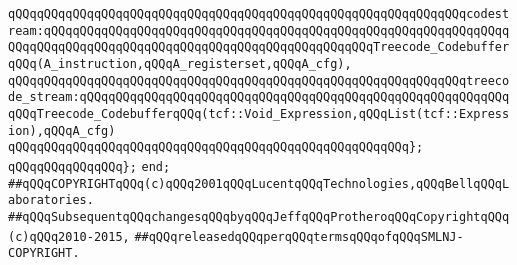 \newline
\verb|qQQqqQQqqQQqqQQqqQQqqQQqqQQqqQQqqQQqqQQqqQQqqQQqqQQqqQQqqQQqqQQqcodestream:qQQqqQQqqQQqqQQqqQQqqQQqqQQqqQQqqQQqqQQqqQQqqQQqqQQqqQQqqQQqqQQqqQQqqQQqqQQqqQQqqQQqqQQqqQQqqQQqqQQqqQQqqQQqqQQqqQQqTreecode_CodebufferqQQq(A_instruction,qQQqA_registerset,qQQqA_cfg),|\newline
\verb|qQQqqQQqqQQqqQQqqQQqqQQqqQQqqQQqqQQqqQQqqQQqqQQqqQQqqQQqqQQqqQQqtreecode_stream:qQQqqQQqqQQqqQQqqQQqqQQqqQQqqQQqqQQqqQQqqQQqqQQqqQQqqQQqqQQqqQQqTreecode_CodebufferqQQq(tcf::Void_Expression,qQQqList(tcf::Expression),qQQqA_cfg)|\newline
\verb|qQQqqQQqqQQqqQQqqQQqqQQqqQQqqQQqqQQqqQQqqQQqqQQqqQQqqQQq};|\newline
\verb|qQQqqQQqqQQqqQQq};|\newline
\verb|end;|\newline
\newline
\newline
\newline
\newline
\newline
\verb|##qQQqCOPYRIGHTqQQq(c)qQQq2001qQQqLucentqQQqTechnologies,qQQqBellqQQqLaboratories.|\newline
\verb|##qQQqSubsequentqQQqchangesqQQqbyqQQqJeffqQQqProtheroqQQqCopyrightqQQq(c)qQQq2010-2015,|\newline
\verb|##qQQqreleasedqQQqperqQQqtermsqQQqofqQQqSMLNJ-COPYRIGHT.|\newline

